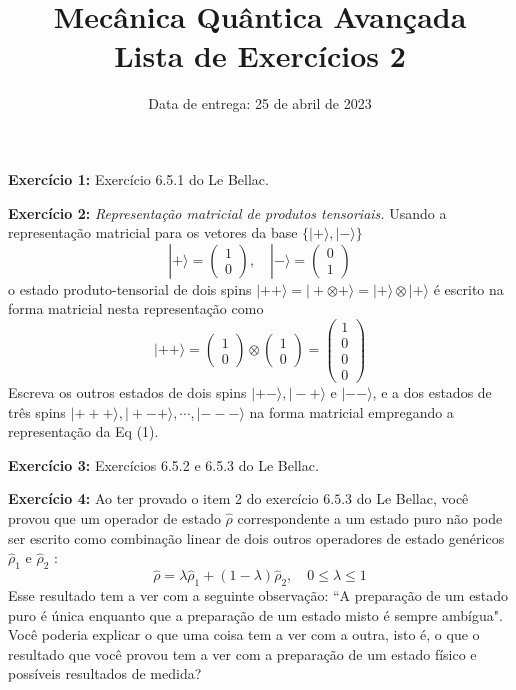 \documentclass[12pt]{article}
\title{Mecânica Quântica Avançada\\Lista de Exercícios 2}
\date{Data de entrega: 25 de abril de 2023}
\begin{document}
\maketitle

\textbf{Exercício 1:} Exercício 6.5.1 do Le Bellac.

\textbf{Exercício 2:} \emph{Representação matricial de produtos tensoriais.} Usando a representação matricial para os vetores da base \(\{|+\rangle,|-\rangle\}\)
\begin{equation}
|+\rangle=\left(\begin{array}{l}1 \\ 0\end{array}\right), \quad|-\rangle=\left(\begin{array}{l}0 \\ 1\end{array}\right)
\end{equation}
o estado produto-tensorial de dois spins \(|++\rangle=|+\otimes+\rangle=|+\rangle \otimes|+\rangle\) é escrito na forma matricial
nesta representação como
\[
|++\rangle=\left(\begin{array}{l}1 \\ 0\end{array}\right) \otimes\left(\begin{array}{l}1 \\ 0\end{array}\right)=\left(\begin{array}{l}1 \\ 0 \\ 0 \\ 0\end{array}\right)
\]
Escreva os outros estados de dois spins \(|+-\rangle,|-+\rangle\) e \(|--\rangle\), e a dos estados de três spins
\(|+++\rangle,|+-+\rangle, \cdots,|---\rangle\) na forma matricial empregando a representação da Eq (1).

\textbf{Exercício 3:} Exercícios 6.5.2 e 6.5.3 do Le Bellac.

\textbf{Exercício 4:} Ao ter provado o item 2 do exercício \(6.5.3\) do Le Bellac, você provou que um operador de
estado \(\hat{\rho}\) correspondente a um estado puro não pode ser escrito como combinação linear de
dois outros operadores de estado genéricos \(\hat{\rho}_{1}\) e \(\hat{\rho}_{2}\) :
\[
\hat{\rho}=\lambda \hat{\rho}_{1}+(1-\lambda) \hat{\rho}_{2}, \quad 0 \leq \lambda \leq 1
\]
Esse resultado tem a ver com a seguinte observação: ``A preparação de um estado puro é única enquanto que a preparação de um estado misto é sempre ambígua". Você poderia explicar o que uma coisa tem a ver com a outra, isto é, o que o resultado que você provou tem a ver com a preparação de um estado físico e possíveis resultados de medida?
\end{document}
